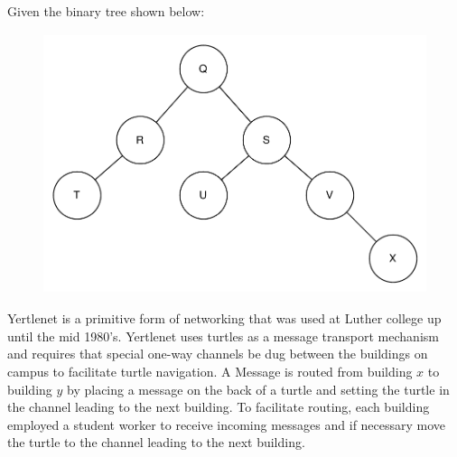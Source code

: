 \documentclass[11pt]{exam}
\begin{document}
\begin{questions}
\newpage
\question Given the binary tree shown below:
\begin{figure}[h!]
    \begin{center}
        \includegraphics[height=3in]{binaryTree}
    \end{center}
\end{figure}

\newpage
\question
Yertlenet is a primitive form of networking that was used at Luther college up until the mid 1980's.  Yertlenet uses turtles as a message transport mechanism and requires that special one-way channels be dug between the buildings on campus to facilitate turtle navigation. A Message is routed from building $x$ to building $y$ by placing a message on the back of a turtle and setting the turtle in the channel leading to the next building.  To facilitate routing, each building employed a student worker to receive incoming messages and if necessary move the turtle to the channel leading to the next building.  


\end{questions}
\end{document}
